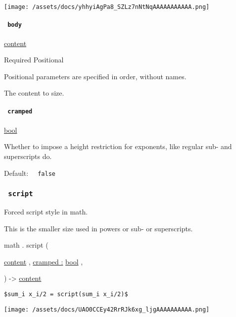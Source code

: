 \texttt{[image: /assets/docs/yhhyiAgPa8\_SZLz7nNtNqAAAAAAAAAAA.png]}

\paragraph{\texorpdfstring{\texttt{\ body\ }}{ body }}\label{functions-inline-body}

\href{/docs/reference/foundations/content/}{content}

{Required} {{ Positional }}

\label{functions-inline-body-positional-tooltip}
Positional parameters are specified in order, without names.

The content to size.

\paragraph{\texorpdfstring{\texttt{\ cramped\ }}{ cramped }}\label{functions-inline-cramped}

\href{/docs/reference/foundations/bool/}{bool}

Whether to impose a height restriction for exponents, like regular sub-
and superscripts do.

Default: \texttt{\ }{\texttt{\ false\ }}\texttt{\ }

\subsubsection{\texorpdfstring{\texttt{\ script\ }}{ script }}\label{functions-script}

Forced script style in math.

This is the smaller size used in powers or sub- or superscripts.

math { . } { script } (

{ \href{/docs/reference/foundations/content/}{content} , } {
\hyperref[functions-script-parameters-cramped]{cramped :}
\href{/docs/reference/foundations/bool/}{bool} , }

) -\textgreater{} \href{/docs/reference/foundations/content/}{content}

\begin{verbatim}
$sum_i x_i/2 = script(sum_i x_i/2)$
\end{verbatim}

\texttt{[image: /assets/docs/UAO0CCEy42RrRJk6xg\_ljgAAAAAAAAAA.png]}

